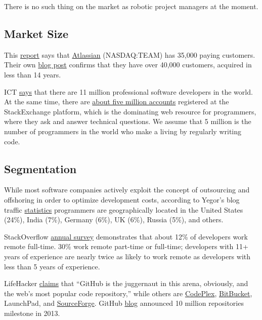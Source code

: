 \documentclass{main}
\begin{document}
There is no such thing on the market as robotic project managers at the moment.

\subsection{Market Size}

This \href{https://www.capterra.com/project-management-software/#infographic}{report}
says that \href{https://www.atlassian.com/}{Atlassian}
(NASDAQ:TEAM) has 35,000 paying customers. Their
own \href{https://blogs.atlassian.com/2014/11/atlassian-customers-thank-you/}{blog post}
confirms that they have over 40,000 customers, acquired in less
than 14 years.

ICT \href{https://www.infoq.com/news/2014/01/IDC-software-developers}{says}
that there are 11 million professional software developers in the
world. At the same time, there are \href{https://sostats.github.io/}{about five million accounts} registered at the
StackExchange platform, which is the dominating web resource for programmers,
where they ask and answer technical questions. We assume that 5 million is the
number of programmers in the world who make a living by regularly writing code.

\subsection{Segmentation}

While most software companies actively exploit the concept of outsourcing and
offshoring in order to optimize development costs, according to Yegor's blog
traffic \href{https://twitter.com/yegor256/status/770780702711226369}{statistics}
programmers are geographically located in the United States
(24\%), India (7\%), Germany (6\%), UK (6\%), Russia (5\%), and others.

StackOverflow \href{https://stackoverflow.com/research/developer-survey-2016}{annual survey}
demonstrates that about 12\% of developers work
remote full-time. 30\% work remote part-time or full-time; developers with 11+
years of experience are nearly twice as likely to work remote as developers with
less than 5 years of experience.

LifeHacker \href{https://lifehacker.com/the-best-alternatives-to-google-code-for-your-programmi-1691688947}{claims}
that ``GitHub is the juggernaut in this arena, obviously, and
the web's most popular code repository,'' while others are
\href{https://www.codeplex.com/}{CodePlex},
\href{https://bitbucket.org/}{BitBucket},
LaunchPad, and
\href{https://sourceforge.net/}{SourceForge}.
GitHub \href{https://github.com/blog/1724-10-million-repositories}{blog} announced 10 million repositories
milestone in 2013.
\end{document}
